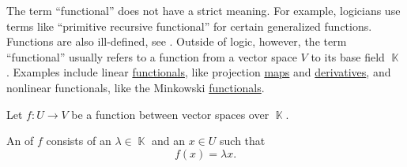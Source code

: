 \begin{remark}\label{rem:functional}
  The term \enquote{functional} does not have a strict meaning. For example, logicians use terms like \enquote{primitive recursive functional} for certain generalized functions. Functions are also ill-defined, see . Outside of logic, however, the term \enquote{functional} usually refers to a function from a vector space \( V \) to its base field \( \BbbK \). Examples include linear \hyperref[def:linear_operator]{functionals}, like projection \hyperref[def:left_module_basis_projection]{maps} and \hyperref[def:differentiability]{derivatives}, and nonlinear functionals, like the Minkowski \hyperref[def:minkowski_functional]{functionals}.
\end{remark}

\begin{definition}\label{def:eigenpair}
  Let \( f: U \to V \) be a function between vector spaces over \( \BbbK \).

  An  of \( f \) consists of an  \( \lambda \in \BbbK \) and an  \( x \in U \) such that
  \begin{equation*}
    f(x) = \lambda x.
  \end{equation*}
\end{definition}
